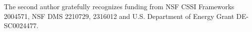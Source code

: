 \documentclass[aos,preprint]{imsart}
\theoremstyle{plain}
\theoremstyle{remark}
\begin{document}

\begin{funding}
The second author gratefully recognizes funding from NSF CSSI Frameworks 2004571, NSF DMS 2210729, 2316012 and U.S. Department of Energy Grant DE-SC0024477.
\end{funding}




\pagebreak
\end{document}
